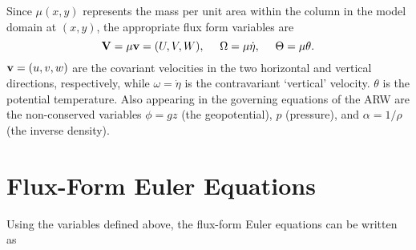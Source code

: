 Since $\mu(x,y)$ represents the mass per unit area within the
column in the model domain at $(x,y)$, the appropriate flux form variables
are
%
\begin{equation}
 \hbox{\bf V} = \mu \hbox{\bf  v} =(U,V,W), ~~~~ \Omega = \mu\dot\eta, ~~~~ 
     \Theta = \mu \theta.                                      
\end{equation}
%
\noindent
${\hbox{\bf v}} = (u,v,w)$ are the covariant velocities in the two
horizontal and vertical directions, respectively, while 
$\omega = \dot\eta$ is the contravariant `vertical' velocity.  $\theta$
is the potential temperature.  Also appearing in the governing equations
of the ARW are the non-conserved variables $\phi=gz$ (the
geopotential), $p$ (pressure), and $\alpha = 1/\rho$ (the inverse
density).  
 
\section{Flux-Form Euler Equations}

Using the variables defined above, the flux-form Euler equations can be
written as

